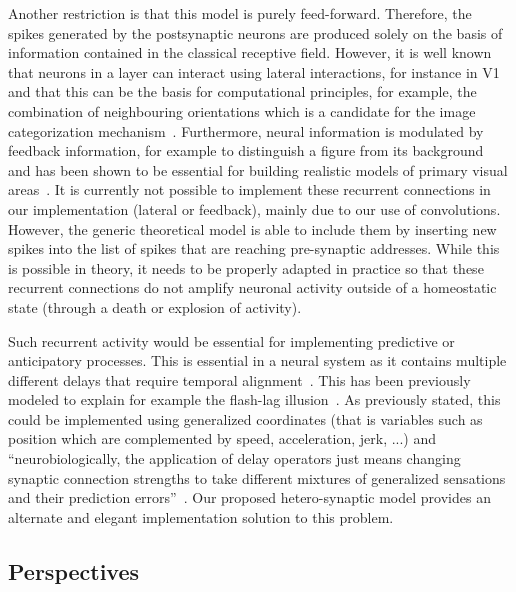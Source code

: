 \documentclass[default]{sn-jnl}%
\theoremstyle{thmstyleone}%
\theoremstyle{thmstyletwo}%
\theoremstyle{thmstylethree}%
\begin{document}
Another restriction is that this model is purely feed-forward. Therefore, the spikes generated by the postsynaptic neurons are produced solely on the basis of information contained in the classical receptive field. However, it is well known that neurons in a layer can interact using lateral interactions, for instance in V1~\citep{chavane_revisiting_2022} and that this can be the basis for computational principles, for example, the combination of neighbouring orientations which is a candidate for the image categorization mechanism~\citep{perrinet_edge_2015}. Furthermore, neural information is modulated by feedback information, for example to distinguish a figure from its background~\citep{roelfsema_early_2016} and has been shown to be essential for building realistic models of primary visual areas~\citep{boutin_sparse_2020, boutin_effect_2020, boutin_pooling_2022}. It is currently not possible to implement these recurrent connections in our implementation (lateral or feedback), mainly due to our use of convolutions. However, the generic theoretical model is able to include them by inserting new spikes into the list of spikes that are reaching pre-synaptic addresses. While this is possible in theory, it needs to be properly adapted in practice so that these recurrent connections do not amplify neuronal activity outside of a homeostatic state (through a death or explosion of activity). 

Such recurrent activity would be essential for implementing predictive or anticipatory processes. This is essential in a neural system as it contains multiple different delays that require temporal alignment~\citep{hogendoorn_predictive_2019}. This has been previously modeled to explain for example the flash-lag illusion~\citep{khoei_flash-lag_2017}. As previously stated, this could be implemented using generalized coordinates (that is variables such as position which are complemented by speed, acceleration, jerk, ...) and ``neurobiologically, the application of delay operators just means changing synaptic connection strengths to take different mixtures of generalized sensations and their prediction errors''~\citep{perrinet_active_2014}. Our proposed hetero-synaptic model provides an alternate and elegant implementation solution to this problem.


\subsection{Perspectives}
\end{document}

